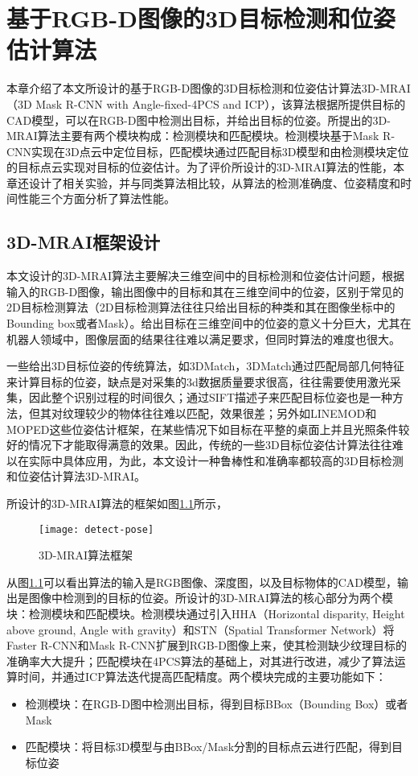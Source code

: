 \chapter{基于RGB-D图像的3D目标检测和位姿估计算法}
\label{chap:pose}
本章介绍了本文所设计的基于RGB-D图像的3D目标检测和位姿估计算法3D-MRAI（3D Mask R-CNN with Angle-fixed-4PCS and ICP），该算法根据所提供目标的CAD模型，可以在RGB-D图中检测出目标，并给出目标的位姿。所提出的3D-MRAI算法主要有两个模块构成：检测模块和匹配模块。检测模块基于Mask R-CNN\cite{He2017}实现在3D点云中定位目标，匹配模块通过匹配目标3D模型和由检测模块定位的目标点云实现对目标的位姿估计。为了评价所设计的3D-MRAI算法的性能，本章还设计了相关实验，并与同类算法相比较，从算法的检测准确度、位姿精度和时间性能三个方面分析了算法性能。

\section{3D-MRAI框架设计}
本文设计的3D-MRAI算法主要解决三维空间中的目标检测和位姿估计问题，根据输入的RGB-D图像，输出图像中的目标和其在三维空间中的位姿，区别于常见的2D目标检测算法（2D目标检测算法往往只给出目标的种类和其在图像坐标中的Bounding box或者Mask）。给出目标在三维空间中的位姿的意义十分巨大，尤其在机器人领域中，图像层面的结果往往难以满足要求，但同时算法的难度也很大。

一些给出3D目标位姿的传统算法，如3DMatch\cite{zeng20163dmatch}，3DMatch通过匹配局部几何特征来计算目标的位姿，缺点是对采集的3d数据质量要求很高，往往需要使用激光采集，因此整个识别过程的时间很久；通过SIFT描述子来匹配目标位姿\cite{dias2015sift}也是一种方法，但其对纹理较少的物体往往难以匹配，效果很差；另外如LINEMOD\cite{hinterstoisser2012gradient}和MOPED\cite{collet2011moped}这些位姿估计框架，在某些情况下如目标在平整的桌面上并且光照条件较好的情况下才能取得满意的效果。因此，传统的一些3D目标位姿估计算法往往难以在实际中具体应用，为此，本文设计一种鲁棒性和准确率都较高的3D目标检测和位姿估计算法3D-MRAI。

所设计的3D-MRAI算法的框架如图\ref{fig:detect-pose}所示，
\begin{figure}[ht]
  \centering
  \texttt{[image: detect-pose]}
  \caption{3D-MRAI算法框架}
  \label{fig:detect-pose}
\end{figure}
从图\ref{fig:detect-pose}可以看出算法的输入是RGB图像、深度图，以及目标物体的CAD模型，输出是图像中检测到的目标的位姿。所设计的3D-MRAI算法的核心部分为两个模块：检测模块和匹配模块。检测模块通过引入HHA（Horizontal disparity, Height above ground, Angle with gravity）和STN（Spatial Transformer Network）将Faster R-CNN\cite{Ren}和Mask R-CNN\cite{He2017}扩展到RGB-D图像上来，使其检测缺少纹理目标的准确率大大提升；匹配模块在4PCS算法\cite{aiger20084}的基础上，对其进行改进，减少了算法运算时间，并通过ICP算法\cite{besl1992method}迭代提高匹配精度。两个模块完成的主要功能如下：
\begin{itemize}
\item {\kai 检测模块}：在RGB-D图中检测出目标，得到目标BBox（Bounding Box）或者Mask
\item {\kai 匹配模块}：将目标3D模型与由BBox/Mask分割的目标点云进行匹配，得到目标位姿
\end{itemize}

